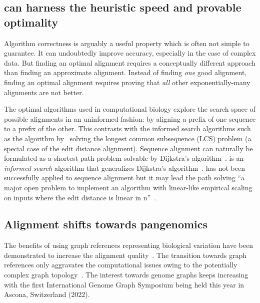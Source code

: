 \subsection*{\A can harness the heuristic speed and provable optimality}

Algorithm correctness is arguably a useful property which is often not simple to
guarantee. It can undoubtedly improve accuracy, especially in the case of
complex data. But finding an optimal alignment requires a conceptually different
approach than finding an approximate alignment. Instead of finding \emph{one}
good alignment, finding an optimal alignment requires proving that \emph{all}
other exponentially-many alignments are not better.

The optimal algorithms used in computational biology explore the search space of
possible alignments in an uninformed fashion: by aligning a prefix of one
sequence to a prefix of the other. This contrasts with the informed search
algorithms such as the algorithm by~\citet{hunt1977fast} solving the longest
common subsequence (LCS) problem (a special case of the edit distance
alignment). Sequence alignment can naturally be formulated as a shortest path
problem solvable by Dijkstra's algorithm~\citep{ukkonen1985algorithms}. \A is an
\emph{informed search} algorithm that generalizes Dijkstra's
algorithm~\citep{hart1968formal}. \A has not been successfully applied to
sequence alignment but it may lead the path solving ``a major open problem to
implement an algorithm with linear-like empirical scaling on inputs where the
edit distance is linear in n''~\citep{medvedev2022theoretical}.

\subsection*{Alignment shifts towards pangenomics}

The benefits of using graph references representing biological variation have
been demonstrated to increase the alignment
quality~\citep{garrison_variation_2018}. The transition towards graph references
only aggravates the computational issues owing to the potentially complex graph
topology~\citep{equi_complexity_2019}. The interest towards genome graphs keeps
increasing with the first International Genome Graph Symposium being held this
year in Ascona, Switzerland (2022).

